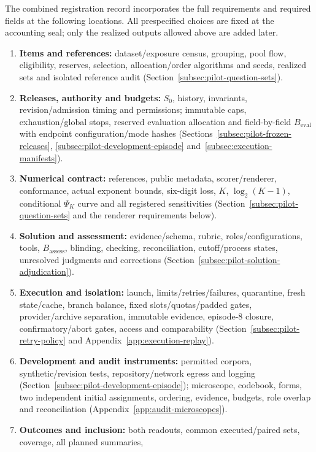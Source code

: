 \documentclass[10pt]{article} %
\providecommand{\1}{\mathbf{1}}  %
\theoremstyle{remark}
\theoremstyle{definition}
\begin{document}
The combined registration record incorporates the full requirements and
required fields at the following locations. All prespecified choices are
fixed at the accounting seal; only the realized outputs allowed above are added later.
\begin{enumerate}[leftmargin=*,itemsep=3pt,topsep=3pt]
\item \textbf{Items and references:}
dataset/exposure census, grouping, pool flow, eligibility, reserves, selection,
allocation/order algorithms and seeds, realized sets and isolated reference
audit (Section~\ref{subsec:pilot-question-sets}).
\item \textbf{Releases, authority and budgets:}
$S_0$, history, invariants, revision/admission timing and permissions;
immutable caps, exhaustion/global stops, reserved evaluation allocation and
field-by-field $B_{\mathrm{eval}}$ with endpoint configuration/mode hashes
(Sections~\ref{subsec:pilot-frozen-releases},
\ref{subsec:pilot-development-episode} and~\ref{subsec:execution-manifests}).
\item \textbf{Numerical contract:}
references, public metadata, scorer/renderer, conformance, actual exponent
bounds, six-digit loss, $K$, $\log_2(K-1)$, conditional $\Psi_K$ curve and
all registered sensitivities (Section~\ref{subsec:pilot-question-sets}
and the renderer requirements below).
\item \textbf{Solution and assessment:}
evidence/schema, rubric, roles/configurations, tools, $B_{\mathrm{assess}}$,
blinding, checking, reconciliation, cutoff/process states, unresolved judgments
and corrections (Section~\ref{subsec:pilot-solution-adjudication}).
\item \textbf{Execution and isolation:}
launch, limits/retries/failures, quarantine, fresh state/cache, branch balance,
fixed slots/quotas/padded gates, provider/archive separation, immutable evidence,
episode-8 closure, confirmatory/abort gates, access and comparability
(Section~\ref{subsec:pilot-retry-policy} and Appendix~\ref{app:execution-replay}).
\item \textbf{Development and audit instruments:}
permitted corpora, synthetic/revision tests, repository/network egress and
logging (Section~\ref{subsec:pilot-development-episode}); microscope,
codebook, forms, two independent initial assignments, ordering, evidence,
budgets, role overlap and reconciliation (Appendix~\ref{app:audit-microscopes}).
\item \textbf{Outcomes and inclusion:}
both readouts, common executed/paired sets, coverage, all planned summaries,

\end{enumerate}
\end{document}
